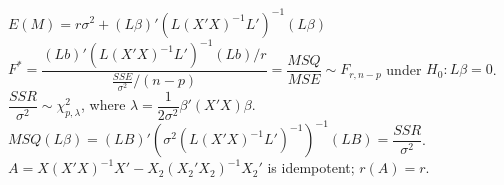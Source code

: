 \documentclass[10pt,landscape]{article}
\begin{document}
\begin{multicols}{3}
 $E\left(M\right)=r\sigma^{2}+\left(L\beta\right)'\left(L\left(X'X\right)^{-1}L'\right)^{-1}\left(L\beta\right)$\\
 $F^{*}=\dfrac{\left(Lb\right)'\left(L\left(X'X\right)^{-1}L'\right)^{-1}\left(Lb\right)/r}{\frac{SSE}{\sigma^{2}}/\left(n-p\right)}=\dfrac{MSQ}{MSE}\sim F_{r,n-p}$ under $H_{0}:L\beta=0$.\\
 $\dfrac{SSR}{\sigma^{2}}\sim\chi_{p,\lambda}^{2}$, where $\lambda=\dfrac{1}{2\sigma^{2}}\beta'\left(X'X\right)\beta$.\\
 $MSQ\left(L\beta\right)=\left(LB\right)'\left(\sigma^{2}\left(L\left(X'X\right)^{-1}L'\right)^{-1}\right)^{-1}\left(LB\right)=\dfrac{SSR}{\sigma^{2}}$.\\
 $A=X\left(X'X\right)^{-1}X'-X_{2}\left(X_{2}'X_{2}\right)^{-1}X_{2}'$ is idempotent; $r\left(A\right)=r$.\\


\end{multicols}
\end{document}
